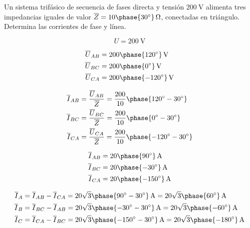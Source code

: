 \documentclass[12pt]{article}
\begin{document}
Un sistema trifásico de secuencia de fases directa y tensión
$\SI{200}{\volt}$ alimenta tres impedancias iguales de valor
$\overline{Z} = \SI[parse-numbers=false]{10\phase{\ang{30}}}{\ohm}$,
conectadas en triángulo. Determina las corrientes de fase y línea.

\noindent\hrulefill

\[
  U = \SI[parse-numbers=false]{200}{\volt}
\]
  
  \begin{align*}
    \overline{U}_{AB} &= \SI[parse-numbers=false]{200\phase{\ang{120}}}{\volt}\\
    \overline{U}_{BC} &= \SI[parse-numbers=false]{200\phase{\ang{0}}}{\volt}\\
    \overline{U}_{CA} &= \SI[parse-numbers=false]{200\phase{\ang{-120}}}{\volt}\\
  \end{align*}

 \begin{align*}
   \overline{I}_{AB} &= \frac{\overline{U}_{AB}}{\overline{Z}} = \frac{200}{10}\phase{\ang{120} - \ang{30}} \\
   \overline{I}_{BC} &= \frac{\overline{U}_{BC}}{\overline{Z}} = \frac{200}{10}\phase{\ang{0} - \ang{30}}\\
   \overline{I}_{CA} &= \frac{\overline{U}_{CA}}{\overline{Z}} = \frac{200}{10}\phase{\ang{-120} - \ang{30}}
 \end{align*}

  \begin{align*}
    \overline{I}_{AB} &= \SI[parse-numbers=false]{20\phase{\ang{90}}}{\ampere}\\
    \overline{I}_{BC} &= \SI[parse-numbers=false]{20\phase{\ang{-30}}}{\ampere}\\
    \overline{I}_{CA} &= \SI[parse-numbers=false]{20\phase{\ang{-150}}}{\ampere}
  \end{align*}

 \begin{align*}
   \overline{I}_A &= \overline{I}_{AB} - \overline{I}_{CA} = \SI[parse-numbers=false]{20\sqrt{3}\phase{\ang{90}-\ang{30}}}{\ampere}=  \SI[parse-numbers=false]{20\sqrt{3}\phase{\ang{60}}}{\ampere}\\
   \overline{I}_B &= \overline{I}_{BC} - \overline{I}_{AB} = \SI[parse-numbers=false]{20\sqrt{3}\phase{\ang{-30} - \ang{30}}}{\ampere} =  \SI[parse-numbers=false]{20\sqrt{3}\phase{\ang{-60}}}{\ampere}\\
   \overline{I}_C &= \overline{I}_{CA} - \overline{I}_{BC} = \SI[parse-numbers=false]{20\sqrt{3}\phase{\ang{-150} - \ang{30}}}{\ampere}=  \SI[parse-numbers=false]{20\sqrt{3}\phase{\ang{-180}}}{\ampere}\\
 \end{align*}
\end{document}
